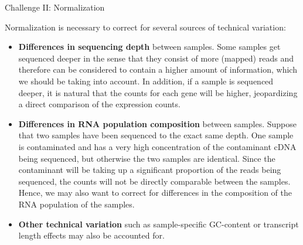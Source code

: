 \documentclass[ignorenonframetext,]{beamer}
\providecommand{\tightlist}{%
  \setlength{\itemsep}{0pt}\setlength{\parskip}{0pt}}
\begin{document}
\begin{frame}{Challenge II: Normalization}
\protect\hypertarget{challenge-ii-normalization}{}

Normalization is necessary to correct for several sources of technical
variation:

\begin{itemize}
\tightlist
\item
  \textbf{Differences in sequencing depth} between samples. Some samples
  get sequenced deeper in the sense that they consist of more (mapped)
  reads and therefore can be considered to contain a higher amount of
  information, which we should be taking into account. In addition, if a
  sample is sequenced deeper, it is natural that the counts for each
  gene will be higher, jeopardizing a direct comparison of the
  expression counts.
\item
  \textbf{Differences in RNA population composition} between samples.
  Suppose that two samples have been sequenced to the exact same depth.
  One sample is contaminated and has a very high concentration of the
  contaminant cDNA being sequenced, but otherwise the two samples are
  identical. Since the contaminant will be taking up a significant
  proportion of the reads being sequenced, the counts will not be
  directly comparable between the samples. Hence, we may also want to
  correct for differences in the composition of the RNA population of
  the samples.
\item
  \textbf{Other technical variation} such as sample-specific GC-content
  or transcript length effects may also be accounted for.
\end{itemize}

\end{frame}
\end{document}
